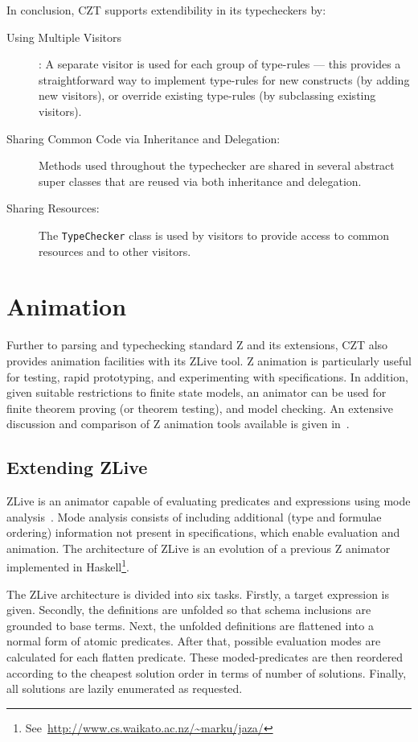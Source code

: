 \documentclass{llncs}
\begin{document}
In conclusion, CZT supports extendibility in its typecheckers by:
\begin{description}
 \item[Using Multiple Visitors]: A separate visitor is used for each
  group of type-rules --- this provides a straightforward way to implement
  type-rules for new constructs (by adding new visitors), or override
  existing type-rules (by subclassing existing visitors).
 \item[Sharing Common Code via Inheritance and Delegation:]
   Methods used throughout the typechecker
   are shared in several abstract super classes that are reused
   via both inheritance and delegation.
 \item[Sharing Resources:] The {\tt TypeChecker} class is used by
   visitors to provide access to common resources and to other visitors.
\end{description}

\section{Animation}\label{animation}

    Further to parsing and typechecking standard Z and its extensions,
    CZT also provides animation facilities with its ZLive tool.  Z
    animation is particularly useful for testing, rapid prototyping,
    and experimenting with specifications.  In addition, given
    suitable restrictions to finite state models, an animator can be
    used for finite theorem proving (or theorem testing), and model
    checking.  An extensive discussion and comparison of Z animation
    tools available is given in~\cite{utting-jaza}.

\subsection{Extending ZLive}

    ZLive is an animator capable of evaluating predicates and
    expressions using mode analysis~\cite{winikooff98}.
    Mode analysis consists of including additional (type and formulae
    ordering) information not present in specifications, which enable
    evaluation and animation.
    The architecture of ZLive is an evolution of a previous Z animator
    implemented in
    Haskell\footnote{See~\url{http://www.cs.waikato.ac.nz/~marku/jaza/}}.

    The ZLive architecture is divided into six tasks.  Firstly, a
    target expression is given. Secondly, the definitions are unfolded
    so that schema inclusions are grounded to base terms. Next, the
    unfolded definitions are flattened into a normal form of atomic predicates.
    After that, possible evaluation modes are calculated for each flatten
    predicate.  These moded-predicates are then reordered according to the
    cheapest solution order in terms of number of solutions.  Finally,
    all solutions are lazily enumerated as requested.
\end{document}
